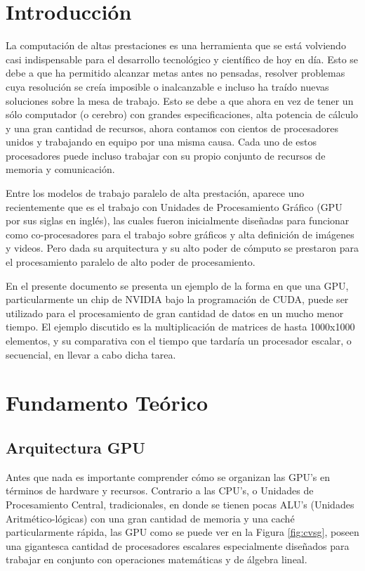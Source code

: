\documentclass{article}
\begin{document}
\hypersetup{pdfborder=0 0 0}



\setcounter{page}{1}

\tableofcontents

\newpage
\setcounter{page}{1}

\section{Introducción}
La computación de altas prestaciones es una herramienta que se está volviendo casi indispensable para el desarrollo tecnológico y científico de hoy en día. Esto se debe a que ha permitido alcanzar metas antes no pensadas, resolver problemas cuya resolución se creía imposible o inalcanzable e incluso ha traído nuevas soluciones sobre la mesa de trabajo. Esto se debe a que ahora en vez de tener un sólo computador (o cerebro) con grandes especificaciones, alta potencia de cálculo y una gran cantidad de recursos, ahora contamos con cientos de procesadores unidos y trabajando en equipo por una misma causa. Cada uno de estos procesadores puede incluso trabajar con su propio conjunto de recursos de memoria y comunicación.

Entre los modelos de trabajo paralelo de alta prestación, aparece uno recientemente que es el trabajo con Unidades de Procesamiento Gráfico (GPU por sus siglas en inglés), las cuales fueron inicialmente diseñadas para funcionar como co-procesadores para el trabajo sobre gráficos y alta definición de imágenes y videos. Pero dada su arquitectura y su alto poder de cómputo se prestaron para el procesamiento paralelo de alto poder de procesamiento. 

En el presente documento se presenta un ejemplo de la forma en que una GPU, particularmente un chip de NVIDIA bajo la programación de CUDA, puede ser utilizado para el procesamiento de gran cantidad de datos en un mucho menor tiempo. El ejemplo discutido es la multiplicación de matrices de hasta 1000x1000 elementos, y su comparativa con el tiempo que tardaría un procesador escalar, o secuencial, en llevar a cabo dicha tarea. 

\newpage
\section{Fundamento Teórico}
\subsection{Arquitectura GPU}
Antes que nada es importante comprender cómo se organizan las GPU's en términos de hardware y recursos. Contrario a las CPU's, o Unidades de Procesamiento Central, tradicionales, en donde se tienen pocas ALU's (Unidades Aritmético-lógicas) con una gran cantidad de memoria y una caché particularmente rápida, las GPU como se puede ver en la Figura \ref{fig:cvsg}, poseen una gigantesca cantidad de procesadores escalares especialmente diseñados para trabajar en conjunto con operaciones matemáticas y de álgebra lineal. 
\end{document}
